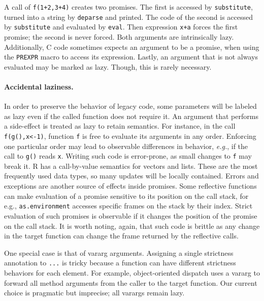 \documentclass[screen,acmsmall]{acmart}
\renewcommand{\c}[1]{\lstinline |#1|\xspace}
\newcommand{\eg}{\emph{e.g.},\xspace}
\begin{document}
\medskip

A call of \c{f(1+2,3+4)} creates two promises. The first is accessed by
\c{substitute}, turned into a string by \c{deparse} and printed. The code of the
second is accessed by \c{substitute} and evaluated by \c{eval}. Then expression
\c{x+a} forces the first promise; the second is never forced. Both arguments are
intrinsically lazy.
Additionally, C code sometimes expects an
argument to be a promise, when using the \c{PREXPR} macro to access its
expression. Lastly, an argument that is not always evaluated may be marked as
lazy. Though, this is rarely necessary.

\paragraph{Accidental laziness.} In order to preserve the behavior of legacy
code, some parameters will be labeled as lazy even if the called function does
not require it. An argument that performs a side-effect is treated as lazy to
retain semantics. For instance, in the call \c{f(g(),x<-1)}, function \c f is
free to evaluate its arguments in any order. Enforcing one particular order may
lead to observable differences in behavior, \eg if the call to \c{g()} reads
\c{x}. Writing such code is error-prone, as small changes to \c f may break it.
R has a call-by-value semantics for vectors and lists. These are the most
frequently used data types, so many updates will be locally contained. Errors
and exceptions are another source of effects inside promises. Some reflective
functions can make evaluation of a promise sensitive to its position on the call
stack, for e.g., \c{as.environment} accesses specific frames on the stack by
their index. Strict evaluation of such promises is observable if it changes the
position of the promise on the call stack. It is worth noting, again, that such
code is brittle as any change in the target function can change the frame
returned by the reflective calls.

One special case is that of vararg arguments. Assigning a single strictness
annotation to \c{...} is tricky because a function can have different strictness
behaviors for each element. For example, object-oriented dispatch uses a vararg
to forward all method arguments from the caller to the target function. Our
current choice is pragmatic but imprecise; all varargs remain lazy.
\end{document}
